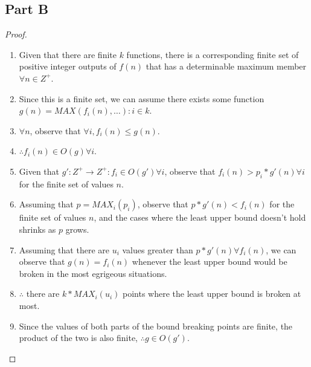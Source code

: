 \documentclass{article}
\begin{document}
\subsection{Part B}
\begin{proof}
      \begin{enumerate}
            \item Given that there are finite $k$ functions, there is a corresponding finite
                  set of positive integer outputs of $f(n)$ that has a determinable maximum
                  member $\forall n \in Z^+$.
            \item Since this is a finite set, we can assume there exists some function $g(n)
                        = MAX({f_i(n),\dots}) : i \in k$.
            \item $\forall n$, observe that $\forall i, f_i(n) \leq g(n)$.
            \item $\therefore f_i(n) \in O(g) \forall i$.
            \item Given that $g' : Z^+ \rightarrow Z^+ : f_i \in O(g') \forall i$, observe
                  that $f_i(n) > p_i * g'(n) \forall i$ for the finite set of values $n$.
            \item Assuming that  $p = MAX_i (p_i)$, observe that $p*g'(n) < f_i(n)$ for the
                  finite set of values $n$, and the cases where the least upper bound doesn't hold shrinks as
                  $p$ grows.
            \item Assuming that there are $u_i$ values greater than $p * g'(n) \forall
                        f_i(n)$, we can observe that $g(n) = f_i(n)$ whenever the least upper
                  bound would be
                  broken in the most egrigeous situations.
            \item $\therefore$ there are $ k * MAX_i (u_i)$ points where the least upper bound is broken at
                  most.
            \item Since the values of both parts of the bound breaking points are
                  finite, the product of the two is also finite, $\therefore g \in O(g')$.

      \end{enumerate}
\end{proof}
\end{document}
